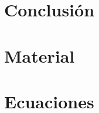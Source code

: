\documentclass[spanish, a4paper, 12pt, twoside, openany,final]{book}
\numberwithin{equation}{section}
\begin{document}
\clearpage


\chapter{Conclusión}
    
\clearpage

\newpage
\renewcommand\refname{Referencias}          %
{                           %
}

\newpage
\renewcommand{\appendixpagename}{Apéndices}     %

\appendix   %

\chapter{Material}

\chapter{Ecuaciones}
\end{document}
